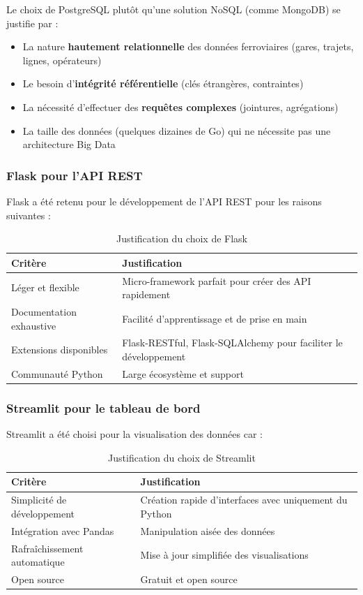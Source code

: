 \documentclass[12pt,a4paper]{article}
\begin{document}
Le choix de PostgreSQL plutôt qu'une solution NoSQL (comme MongoDB) se justifie par :
\begin{itemize}
    \item La nature \textbf{hautement relationnelle} des données ferroviaires (gares, trajets, lignes, opérateurs)
    \item Le besoin d'\textbf{intégrité référentielle} (clés étrangères, contraintes)
    \item La nécessité d'effectuer des \textbf{requêtes complexes} (jointures, agrégations)
    \item La taille des données (quelques dizaines de Go) qui ne nécessite pas une architecture Big Data
\end{itemize}

\subsubsection{Flask pour l'API REST}

Flask a été retenu pour le développement de l'API REST pour les raisons suivantes :

\begin{table}[h!]
\centering
\begin{tabular}{|p{4cm}|p{10cm}|}
\hline
\textbf{Critère} & \textbf{Justification} \\
\hline
Léger et flexible & Micro-framework parfait pour créer des API rapidement \\
\hline
Documentation exhaustive & Facilité d'apprentissage et de prise en main \\
\hline
Extensions disponibles & Flask-RESTful, Flask-SQLAlchemy pour faciliter le développement \\
\hline
Communauté Python & Large écosystème et support \\
\hline
\end{tabular}
\caption{Justification du choix de Flask}
\end{table}

\subsubsection{Streamlit pour le tableau de bord}

Streamlit a été choisi pour la visualisation des données car :

\begin{table}[h!]
\centering
\begin{tabular}{|p{4cm}|p{10cm}|}
\hline
\textbf{Critère} & \textbf{Justification} \\
\hline
Simplicité de développement & Création rapide d'interfaces avec uniquement du Python \\
\hline
Intégration avec Pandas & Manipulation aisée des données \\
\hline
Rafraîchissement automatique & Mise à jour simplifiée des visualisations \\
\hline
Open source & Gratuit et open source \\
\hline
\end{tabular}
\caption{Justification du choix de Streamlit}
\end{table}
\end{document}
